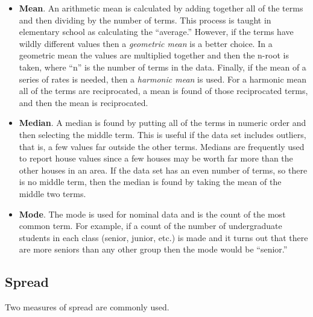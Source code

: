 \begin{itemize}
	\item \textbf{Mean}. An arithmetic mean is calculated by adding together all of the terms and then dividing by the number of terms. This process is taught in elementary school as calculating the ``average.'' However, if the terms have wildly different values then a \textit{geometric mean} is a better choice. In a geometric mean the values are multiplied together and then the n-root is taken, where ``n'' is the number of terms in the data. Finally, if the mean of a series of rates is needed, then a \textit{harmonic mean} is used. For a harmonic mean all of the terms are reciprocated, a mean is found of those reciprocated terms, and then the mean is reciprocated. 

	\item \textbf{Median}. A median is found by putting all of the terms in numeric order and then selecting the middle term. This is useful if the data set includes outliers, that is, a few values far outside the other terms. Medians are frequently used to report house values since a few houses may be worth far more than the other houses in an area. If the data set has an even number of terms, so there is no middle term, then the median is found by taking the mean of the middle two terms.

	\item \textbf{Mode}. The mode is used for nominal data and is the count of the most common term. For example, if a count of the number of undergraduate students in each class (senior, junior, etc.) is made and it turns out that there are more seniors than any other group then the mode would be ``senior.''
\end{itemize}

\subsection{Spread}

Two measures of spread are commonly used. 

